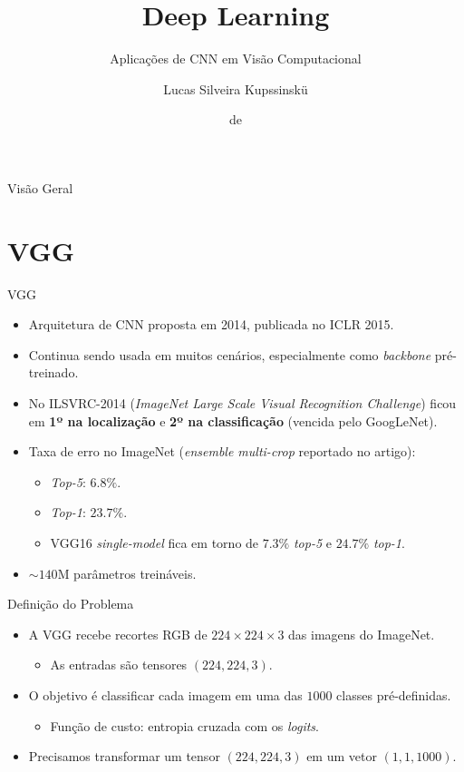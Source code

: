 \documentclass[aspectratio=169,xcolor=dvipsnames]{beamer}
\title{Deep Learning}
\subtitle{Aplicações de CNN em Visão Computacional}
\author{Lucas Silveira Kupssinskü}
\institute
{
    Machine Learning Theory and Applications Laboratory \\
    PUCRS
}
\date{\mespor de \the\year}
\begin{document}
\begin{frame}
    \titlepage
\end{frame}

\begin{frame}{Visão Geral}
    \tableofcontents
\end{frame}

\section{VGG}

\begin{frame}{VGG}
\begin{itemize}
    \item Arquitetura de CNN proposta em 2014, publicada no ICLR 2015.
    \item Continua sendo usada em muitos cenários, especialmente como \textit{backbone} pré-treinado.
    \item No ILSVRC-2014 (\textit{ImageNet Large Scale Visual Recognition Challenge}) ficou em \textbf{1º na localização} e \textbf{2º na classificação} (vencida pelo GoogLeNet).
    \item Taxa de erro no ImageNet (\textit{ensemble multi-crop} reportado no artigo):
    \begin{itemize}
        \item \textit{Top-5}: $6.8\%$.
        \item \textit{Top-1}: $23.7\%$.
        \item VGG16 \textit{single-model} fica em torno de $7.3\%$ \textit{top-5} e $24.7\%$ \textit{top-1}.
    \end{itemize}
    \item $\sim 140$M parâmetros treináveis.
\end{itemize}
\end{frame}

\begin{frame}{Definição do Problema}
\begin{itemize}
    \item A VGG recebe recortes RGB de $224\times 224 \times 3$ das imagens do ImageNet.
    \begin{itemize}
        \item As entradas são tensores $(224, 224, 3)$.
    \end{itemize}
    \item O objetivo é classificar cada imagem em uma das $1000$ classes pré-definidas.
    \begin{itemize}
        \item Função de custo: entropia cruzada com os \textit{logits}.
    \end{itemize}
    \item Precisamos transformar um tensor $(224, 224, 3)$ em um vetor $(1, 1, 1000)$.
\end{itemize}
\end{frame}
\end{document}
